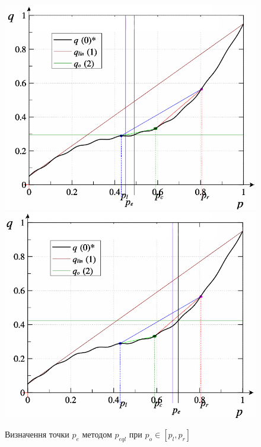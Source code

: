 \documentclass[14pt,handout,utf8]{beamer}
\newlength\TW
\begin{document}
\begin{frame}
  \begin{figure}[htb!]
    \centerline{
      \includegraphics[width=49\TW]{../p3/p/pq_sin-p_pq_po=049_xl.png}
    \hfill
    \includegraphics[width=49\TW]{../p3/p/pq_sin-p_pq_po=070_xl.png}
    }
    \caption{Визначення точки $p_e$ методом $p_{eql}$ при $p_o \in [p_l, p_r]$}
    \label{atu:f:pq_4}
  \end{figure}



\end{frame}
\end{document}
